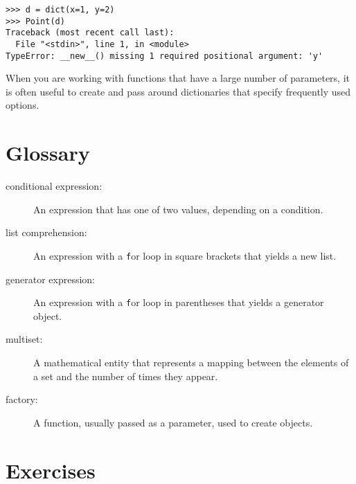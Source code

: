 \documentclass[
DIV=11,
fontsize=12,
twoside,
headinclude=false,
titlepage=firstiscover,
abstract=true,
headsepline=true,
footsepline=true,
chapterprefix=true, %
headings=big,
bibliography=totoc,%
captions=tableheading
]{scrbook}
\theoremstyle{definition}
\begin{document}
\begin{lstlisting}
>>> d = dict(x=1, y=2)
>>> Point(d)
Traceback (most recent call last):
  File "<stdin>", line 1, in <module>
TypeError: __new__() missing 1 required positional argument: 'y'
\end{lstlisting}
%
When you are working with functions that have a large number of
parameters, it is often useful to create and pass around dictionaries
that specify frequently used options.


\section{Glossary}

\begin{description}

\item[conditional expression:] An expression that has one of two
values, depending on a condition.

\item[list comprehension:] An expression with a {\texttt for} loop in square
brackets that yields a new list.

\item[generator expression:] An expression with a {\texttt for} loop in parentheses
that yields a generator object.  

\item[multiset:] A mathematical entity that represents a mapping
between the elements of a set and the number of times they appear.

\item[factory:] A function, usually passed as a parameter, used to
create objects. 

\end{description}




\section{Exercises}
\end{document}
